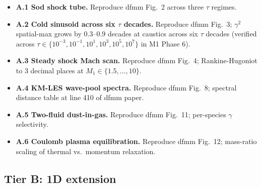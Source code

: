 \documentclass[11pt]{article}
\begin{document}
\begin{itemize}
\item \textbf{A.1 Sod shock tube.} Reproduce dfmm Fig.\ 2 across
three $\tau$ regimes.
\item \textbf{A.2 Cold sinusoid across six $\tau$ decades.} Reproduce
dfmm Fig.\ 3; $\gamma^2$ spatial-max grows by $0.3$--$0.9$ decades at
caustics across six $\tau$ decades (verified across
$\tau\in\{10^{-3},10^{-1},10^{1},10^{3},10^{5},10^{7}\}$ in M1 Phase 6).
\item \textbf{A.3 Steady shock Mach scan.} Reproduce dfmm Fig.\ 4;
Rankine-Hugoniot to 3 decimal places at $M_1\in\{1.5,\ldots,10\}$.
\item \textbf{A.4 KM-LES wave-pool spectra.} Reproduce dfmm Fig.\ 8;
spectral distance table at line 410 of dfmm paper.
\item \textbf{A.5 Two-fluid dust-in-gas.} Reproduce dfmm Fig.\ 11;
per-species $\gamma$ selectivity.
\item \textbf{A.6 Coulomb plasma equilibration.} Reproduce dfmm Fig.\ 12;
mass-ratio scaling of thermal vs.\ momentum relaxation.
\end{itemize}

\subsection{Tier B: 1D extension}
\label{sec:tier-B}
\end{document}
